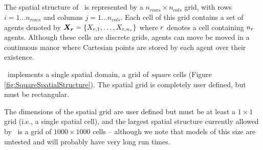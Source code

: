 %		

\subsection{\label{sec:spatial-structure}}
The spatial structure of \IBM\ is represented by a $n_{rows} \times n_{cols}$ grid, with rows $i=1 \dots n_{rows}$ and columns $j=1 \ldots n_{cols}$. Each cell of this grid contains a set of agents denoted by \(\bm{X_r} = \{X_{r,1}, \dots, X_{r, n_r}\}\) where \(r\) denotes a cell containing \({n_r}\) agents. Although these cells are discrete grids, agents can move be moved in a continuous manor where Cartesian points are stored by each agent over their existence. 

\IBM\ implements a single spatial domain, a grid of \emph{square} cells (Figure \ref{fig:SquareSpatialStructure}). The spatial grid is completely user defined, but must be rectangular. 

The dimensions of the spatial grid are user defined but must be at least a $1 \times 1$ grid (i.e., a single spatial cell), and the largest spatial structure currently allowed by \IBM\ is a grid of $1000 \times 1000$ cells -- although we note that models of this size are untested and will probably have very long run times. 

